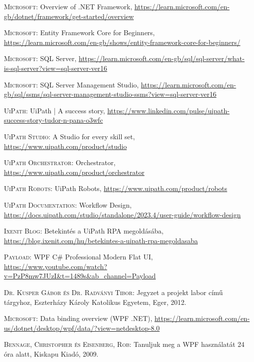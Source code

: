 \documentclass[
]{thesis-ekf}
\theoremstyle{definition}
\theoremstyle{remark}
\begin{document}
\begin{thebibliography}{2}
\textsc{Microsoft}: Overview of .NET Framework, 
\url{https://learn.microsoft.com/en-gb/dotnet/framework/get-started/overview}

\textsc{Microsoft}: Entity Framework Core for Beginners, 
\url{https://learn.microsoft.com/en-gb/shows/entity-framework-core-for-beginners/}

\textsc{Microsoft}: SQL Server, 
\url{https://learn.microsoft.com/en-gb/sql/sql-server/what-is-sql-server?view=sql-server-ver16}

\textsc{Microsoft}: SQL Server Management Studio, 
\url{https://learn.microsoft.com/en-gb/sql/ssms/sql-server-management-studio-ssms?view=sql-server-ver16}


\textsc{UiPath}: UiPath | A success story, 
\url{https://www.linkedin.com/pulse/uipath-success-story-tudor-n-pana-o3wfc}


\textsc{UiPath Studio}: A Studio for every skill set, 
\url{https://www.uipath.com/product/studio}

\textsc{UiPath Orchestrator}: Orchestrator, 
\url{https://www.uipath.com/product/orchestrator}


\textsc{UiPath Robots}: UiPath Robots, 
\url{https://www.uipath.com/product/robots}

\textsc{UiPath Documentation}: Workflow Design, 
\url{https://docs.uipath.com/studio/standalone/2023.4/user-guide/workflow-design}

\textsc{Ixenit Blog}: Betekintés a UiPath RPA megoldásába, 
\url{https://blog.ixenit.com/hu/betekintes-a-uipath-rpa-megoldasaba}

\textsc{Payload}: WPF C\# Professional Modern Flat UI, 
\url{https://www.youtube.com/watch?v=PzP8mw7JUzI&t=1489s&ab_channel=Payload}


\textsc{Dr. Kusper Gábor és Dr. Radványi Tibor}: Jegyzet a projekt labor című tárgyhoz, Eszterházy Károly Katolikus Egyetem, Eger, 2012.

\textsc{Microsoft}: Data binding overview (WPF .NET), 
\url{https://learn.microsoft.com/en-us/dotnet/desktop/wpf/data/?view=netdesktop-8.0}

\textsc{Bennage, Christopher és Eisenberg, Rob}: Tanuljuk meg a WPF használatát 24 óra alatt, Kiskapu Kiadó, 2009.


\end{thebibliography}
\end{document}
